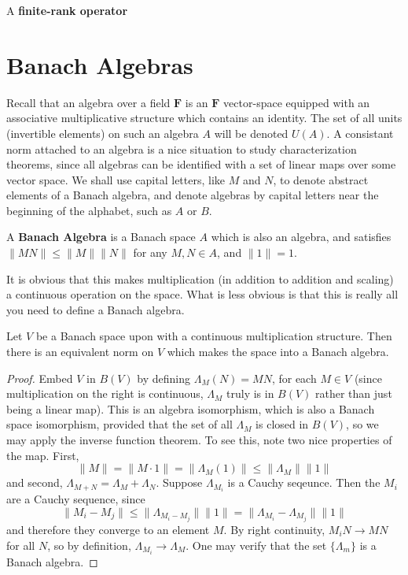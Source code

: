 \begin{definition}
    A {\bf finite-rank operator}
\end{definition}




\chapter{Banach Algebras}

Recall that an algebra over a field $\mathbf{F}$ is an $\mathbf{F}$ vector-space equipped with an associative multiplicative structure which contains an identity. The set of all units (invertible elements) on such an algebra $A$ will be denoted $U(A)$. A consistant norm attached to an algebra is a nice situation to study characterization theorems, since all algebras can be identified with a set of linear maps over some vector space. We shall use capital letters, like $M$ and $N$, to denote abstract elements of a Banach algebra, and denote algebras by capital letters near the beginning of the alphabet, such as $A$ or $B$.

\begin{definition}
    A {\bf Banach Algebra} is a Banach space $A$ which is also an algebra, and satisfies $\| MN \| \leq \| M \| \| N \|$ for any $M,N \in A$, and $\| 1 \| = 1$.
\end{definition}

It is obvious that this makes multiplication (in addition to addition and scaling) a continuous operation on the space. What is less obvious is that this is really all you need to define a Banach algebra.

\begin{theorem}
    Let $V$ be a Banach space upon with a continuous multiplication structure. Then there is an equivalent norm on $V$ which makes the space into a Banach algebra.
\end{theorem}
\begin{proof}
    Embed $V$ in $B(V)$ by defining $\Lambda_M(N) = MN$, for each $M \in V$ (since multiplication on the right is continuous, $\Lambda_M$ truly is in $B(V)$ rather than just being a linear map). This is an algebra isomorphism, which is also a Banach space isomorphism, provided  that the set of all $\Lambda_M$ is closed in $B(V)$, so we may apply the inverse function theorem. To see this, note two nice properties of the map. First,
    \[ \| M \| = \| M \cdot 1 \| = \| \Lambda_{M}(1) \| \leq \| \Lambda_{M} \| \| 1 \|  \]
    and second, $\Lambda_{M + N} = \Lambda_M + \Lambda_N$. Suppose $\Lambda_{M_i}$ is a Cauchy seqeunce. Then the $M_i$ are a Cauchy sequence, since
    \[ \| M_i - M_j \| \leq \| \Lambda_{M_i - M_j} \| \| 1 \| = \| \Lambda_{M_i} - \Lambda_{M_j} \| \| 1 \| \]
    and therefore they converge to an element $M$. By right continuity, $M_i N \to M N$ for all $N$, so by definition, $\Lambda_{M_i} \to \Lambda_M$. One may verify that the set $\{ \Lambda_m \}$ is a Banach algebra.
\end{proof}

